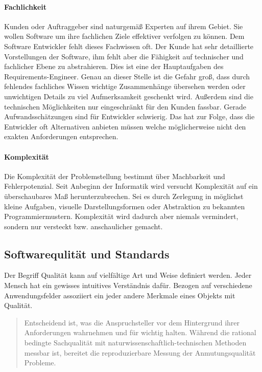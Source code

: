 \paragraph{Fachlichkeit}
Kunden oder Auftraggeber sind naturgemäß Experten auf ihrem Gebiet. Sie wollen Software um ihre fachlichen Ziele effektiver verfolgen zu können. Dem Software Entwickler fehlt dieses Fachwissen oft.
Der Kunde hat sehr detaillierte Vorstellungen der Software, ihm fehlt aber die Fähigkeit auf technischer und fachlicher Ebene zu abstrahieren. Dies ist eine der Hauptaufgaben des Requirements-Engineer. Genau an dieser Stelle ist die Gefahr groß, dass durch fehlendes fachliches Wissen wichtige Zusammenhänge übersehen werden oder unwichtigen Details zu viel Aufmerksamkeit geschenkt wird.
Außerdem sind die technischen Möglichkeiten nur eingeschränkt für den Kunden fassbar. Gerade Aufwandsschätzungen sind für Entwickler schwierig. Das hat zur Folge, dass die Entwickler oft Alternativen anbieten müssen welche möglicherweise nicht den exakten Anforderungen entsprechen.

\paragraph{Komplexität}
Die Komplexität der Problemstellung bestimmt über Machbarkeit und Fehlerpotenzial. Seit Anbeginn der Informatik wird versucht Komplexität auf ein überschaubares Maß herunterzubrechen. Sei es durch Zerlegung in möglichst kleine Aufgaben, visuelle Darstellungsformen oder Abstraktion zu bekannten Programmiermustern.
Komplexität wird dadurch aber niemals vermindert, sondern nur versteckt bzw. anschaulicher gemacht.


\subsection{Softwarequlität und Standards}
\label{sec:quality}
Der Begriff Qualität kann auf vielfältige Art und Weise definiert werden. Jeder Mensch hat ein gewisses intuitives Verständnis dafür. Bezogen auf verschiedene Anwendungsfelder assoziiert ein jeder andere Merkmale eines Objekts mit Qualität.

\begin{quote}
Entscheidend ist, was die Anspruchsteller vor dem Hintergrund ihrer Anforderungen wahrnehmen und für wichtig halten. Während die rational bedingte Sachqualität mit naturwissenschaftlich-technischen Methoden messbar ist, bereitet die reproduzierbare Messung der Anmutungsqualität Probleme.\cite{markgraf_definition_2015}
\end{quote}

